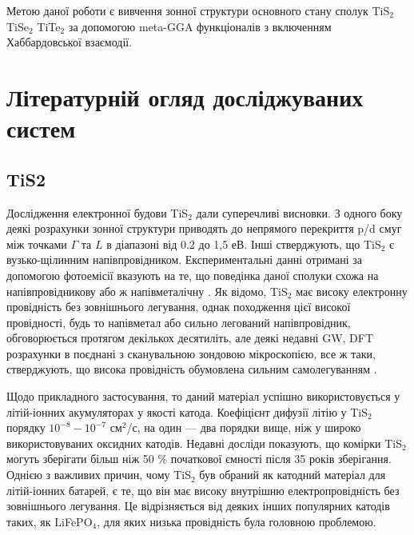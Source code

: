 Метою даної роботи є вивчення зонної структури основного стану сполук TiS$_2$ TiSe$_2$ TiTe$_2$ за допомогою meta-GGA функціоналів з включенням Хаббардовської взаємодії. 

\section{Літературній огляд досліджуваних систем}
\subsection{TiS2}
Дослідження електронної будови TiS$_{2}$ дали суперечливі висновки. З одного боку деякі розрахунки зонної структури приводять до непрямого перекриття p/d смуг між точками $\Gamma$ та $L$ в діапазоні від 0.2 до 1,5 еВ. Інші стверджують, що TiS$_{2}$ є вузько-щілинним напівпровідником. Експериментальні данні отримані за допомогою фотоемісії вказують на те, що поведінка даної сполуки схожа на напівпровідникову \cite{semiconducter} або ж напівметалічну \cite{semimetal}. Як відомо, TiS$_{2}$ має високу електронну провідність без зовнішнього легування, однак походження цієї високої провідності, будь то напівметал або сильно легований напівпровідник, обговорюється протягом декількох десятиліть, але деякі недавні GW, DFT розрахунки в поєднані з сканувальною зондовою мікроскопією, все ж таки, стверджують, що висока провідність обумовлена сильним самолегуванням \cite{semimetal_or_semiconducter}. 

Щодо прикладного застосування, то даний матеріал успішно використовується у літій-іонних акумуляторах у якості катода. Коефіцієнт дифузії літію у TiS$_2$ порядку $10^{-8}-10^{-7}$ см$^2$/с, на один --- два порядки вище, ніж у широко використовуваних оксидних катодів. Недавні досліди показують, що комірки TiS$_2$ могуть зберігати більш ніж 50 \% початкової ємності після 35 років зберігання. Однією з важливих причин, чому TiS$_2$ був обраний як катодний матеріал для літій-іонних батарей, є те, що він має високу внутрішню електропровідність без зовнішнього легування. Це відрізняється від деяких інших популярних катодів таких, як LiFePO$_4$, для яких низька провідність була головною проблемою.

